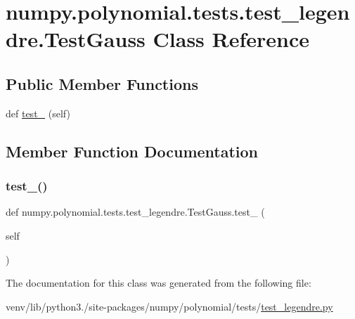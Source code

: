 \hypertarget{classnumpy_1_1polynomial_1_1tests_1_1test__legendre_1_1TestGauss}{}\section{numpy.\+polynomial.\+tests.\+test\+\_\+legendre.\+Test\+Gauss Class Reference}
\label{classnumpy_1_1polynomial_1_1tests_1_1test__legendre_1_1TestGauss}
\subsection*{Public Member Functions}
\begin{DoxyCompactItemize}
\item 
def \hyperlink{classnumpy_1_1polynomial_1_1tests_1_1test__legendre_1_1TestGauss_a87f8cda9d4745eb8d850d56d8ca9d74e}{test\+\_} (self)
\end{DoxyCompactItemize}


\subsection{Member Function Documentation}
\mbox{\label{classnumpy_1_1polynomial_1_1tests_1_1test__legendre_1_1TestGauss_a87f8cda9d4745eb8d850d56d8ca9d74e}} 
\subsubsection{\texorpdfstring{test\+\_()}{test\_100()}}
{\footnotesize\ttfamily def numpy.\+polynomial.\+tests.\+test\+\_\+legendre.\+Test\+Gauss.\+test\+\_ (\begin{DoxyParamCaption}\item[{}]{self }\end{DoxyParamCaption})}



The documentation for this class was generated from the following file\+:\begin{DoxyCompactItemize}
\item 
venv/lib/python3./site-\/packages/numpy/polynomial/tests/\hyperlink{test__legendre_8py}{test\+\_\+legendre.\+py}\end{DoxyCompactItemize}
